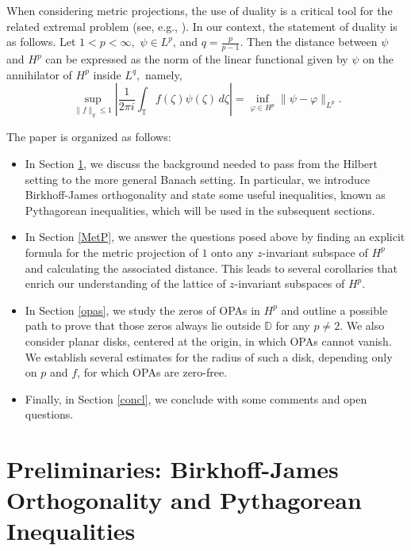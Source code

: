 \documentclass{article}
\theoremstyle{plain}
\numberwithin{Theorem}{section}
\numberwithin{equation}{section}
\theoremstyle{plain}
\theoremstyle{definition}
\renewcommand{\leq}{\leqslant}
\newcommand{\D}{\mathbb{D}}
\newcommand{\T}{\mathbb{T}}
\begin{document}
When considering metric projections, the use of duality is a critical tool for the related extremal problem (see, e.g.,  \cite{Duren,SYaK}).  In our context, the statement of duality is as follows.  Let $1 < p < \infty,$  $\psi \in L^p$, and $q = \frac{p}{p-1}$.  Then the distance between $\psi$ and $H^p$ can be expressed as the norm of the linear functional given by $\psi$ on the annihilator of $H^p$ inside $L^q,$  namely, 
\begin{equation}\label{duality}
\sup_{\|f\|_{q} \leq 1} \left| \frac{1}{2 \pi i} \int_{\T} f(\zeta) \psi(\zeta)   \, d \zeta \right| = \inf_{\varphi \in H^p} \| \psi - \varphi \|_{L^p}.
\end{equation}


The paper is organized as follows:
\begin{itemize}
\item[-]In Section \ref{BJ}, we discuss the background needed to pass from the Hilbert setting to the more general Banach setting. In particular, we introduce Birkhoff-James orthogonality and state some useful inequalities, known as Pythagorean inequalities, which will be used in the subsequent sections.
\item[-]In Section \ref{MetP}, we answer the questions posed above by finding an explicit formula for the metric projection of $1$ onto any $z$-invariant subspace of $H^p$ and calculating the associated distance. This leads to several corollaries that enrich our understanding of the lattice of $z$-invariant subspaces of $H^p$.
\item[-]In Section \ref{opas}, we study the zeros of OPAs in $H^p$ and outline a possible path to prove that those zeros always lie outside $\D$ for any $p \neq 2$.  We also consider planar disks, centered at the origin, in which OPAs cannot vanish. We establish several estimates for the radius of such a disk, depending only on $p$ and $f$, for which OPAs are zero-free. 
\item[-]Finally, in Section \ref{concl}, we conclude with some comments and open questions. 
\end{itemize}







\section{Preliminaries: Birkhoff-James Orthogonality and Pythagorean Inequalities\color{black}}\label{BJ}
\end{document}
